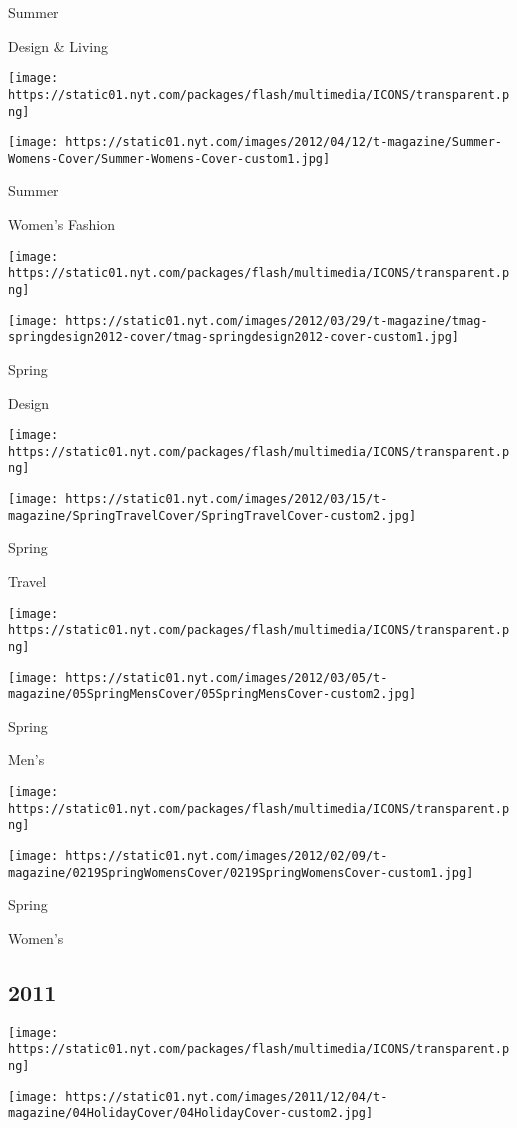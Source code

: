 Summer

Design \& Living

\texttt{[image: https://static01.nyt.com/packages/flash/multimedia/ICONS/transparent.png]}

\texttt{[image: https://static01.nyt.com/images/2012/04/12/t-magazine/Summer-Womens-Cover/Summer-Womens-Cover-custom1.jpg]}

Summer

Women's Fashion

\texttt{[image: https://static01.nyt.com/packages/flash/multimedia/ICONS/transparent.png]}

\texttt{[image: https://static01.nyt.com/images/2012/03/29/t-magazine/tmag-springdesign2012-cover/tmag-springdesign2012-cover-custom1.jpg]}

Spring

Design

\texttt{[image: https://static01.nyt.com/packages/flash/multimedia/ICONS/transparent.png]}

\texttt{[image: https://static01.nyt.com/images/2012/03/15/t-magazine/SpringTravelCover/SpringTravelCover-custom2.jpg]}

Spring

Travel

\texttt{[image: https://static01.nyt.com/packages/flash/multimedia/ICONS/transparent.png]}

\texttt{[image: https://static01.nyt.com/images/2012/03/05/t-magazine/05SpringMensCover/05SpringMensCover-custom2.jpg]}

Spring

Men's

\texttt{[image: https://static01.nyt.com/packages/flash/multimedia/ICONS/transparent.png]}

\texttt{[image: https://static01.nyt.com/images/2012/02/09/t-magazine/0219SpringWomensCover/0219SpringWomensCover-custom1.jpg]}

Spring

Women's

\hypertarget{2011}{%
\subsection{2011}\label{2011}}

\texttt{[image: https://static01.nyt.com/packages/flash/multimedia/ICONS/transparent.png]}

\texttt{[image: https://static01.nyt.com/images/2011/12/04/t-magazine/04HolidayCover/04HolidayCover-custom2.jpg]}

